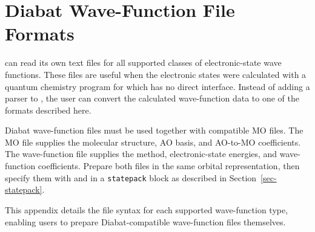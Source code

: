 \chapter[Diabat Wave-Function File Formats]{Diabat Wave-Function File\\Formats}\label{app-diabat-wfn-formats}
\progname{} can read its own text files for all supported classes of electronic-state wave functions. These files are useful when the electronic states were calculated with a quantum chemistry program for which \progname{} has no direct interface. Instead of adding a parser to \progname{}, the user can convert the calculated wave-function data to one of the formats described here.

Diabat wave-function files must be used together with compatible MO files. The MO file supplies the molecular structure, AO basis, and AO-to-MO coefficients. The wave-function file supplies the method, electronic-state energies, and wave-function coefficients. Prepare both files in the same orbital representation, then specify them with  and  in a \texttt{statepack} block as described in Section~\ref{sec-statepack}.

This appendix details the file syntax for each supported wave-function type, enabling users to prepare Diabat-compatible wave-function files themselves.







